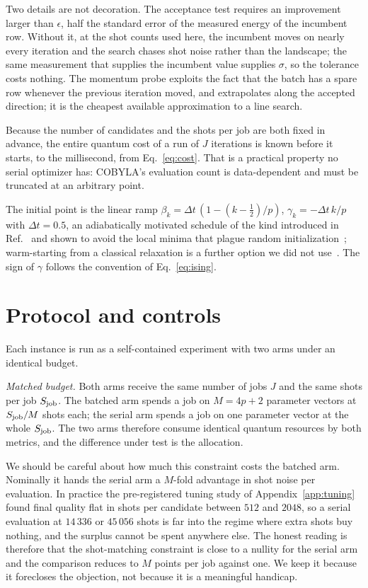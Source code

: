 \documentclass[aps,prx,preprint,superscriptaddress,nofootinbib,longbibliography]{revtex4-2}
\begin{document}
Two details are not decoration. The acceptance test requires an improvement larger than
$\epsilon$, half the standard error of the measured energy of the incumbent row. Without it,
at the shot counts used here, the incumbent moves on nearly every iteration and the search
chases shot noise rather than the landscape; the same measurement that supplies the incumbent
value supplies $\sigma$, so the tolerance costs nothing. The momentum probe exploits the fact
that the batch has a spare row whenever the previous iteration moved, and extrapolates along
the accepted direction; it is the cheapest available approximation to a line search.

Because the number of candidates and the shots per job are both fixed in advance, the entire
quantum cost of a run of $J$ iterations is known before it starts, to the millisecond, from
Eq.~\eqref{eq:cost}. That is a practical property no serial optimizer has: COBYLA's
evaluation count is data-dependent and must be truncated at an arbitrary point.

The initial point is the linear ramp $\beta_k = \Delta t\,(1 - (k-\tfrac12)/p)$,
$\gamma_k = -\Delta t\,k/p$ with $\Delta t = 0.5$, an adiabatically motivated schedule of the kind
introduced in Ref.~\cite{zhou2020qaoa} and shown to avoid the local minima that plague random
initialization~\cite{sack2021annealinginit}; warm-starting from a classical relaxation is a
further option we did not use~\cite{egger2021warmstart}. The sign of $\gamma$ follows the convention of
Eq.~\eqref{eq:ising}.

\section{Protocol and controls}
\label{sec:protocol}

Each instance is run as a self-contained experiment with two arms under an identical budget.

\emph{Matched budget.} Both arms receive the same number of jobs $J$ and the same shots per
job $S_{\rm job}$. The batched arm spends a job on $M = 4p+2$ parameter vectors at
$S_{\rm job}/M$ shots each; the serial arm spends a job on one parameter vector at the whole
$S_{\rm job}$. The two arms therefore consume identical quantum resources by both metrics, and the
difference under test is the allocation.

We should be careful about how much this constraint costs the batched arm. Nominally it hands
the serial arm a $M$-fold advantage in shot noise per evaluation. In practice the pre-registered
tuning study of Appendix~\ref{app:tuning} found final quality flat in shots per candidate between
$512$ and $2048$, so a serial evaluation at $14\,336$ or $45\,056$ shots is far into the regime
where extra shots buy nothing, and the surplus cannot be spent anywhere else. The honest reading
is therefore that the shot-matching constraint is close to a nullity for the serial arm and the
comparison reduces to $M$ points per job against one. We keep it because it forecloses the
objection, not because it is a meaningful handicap.
\end{document}

